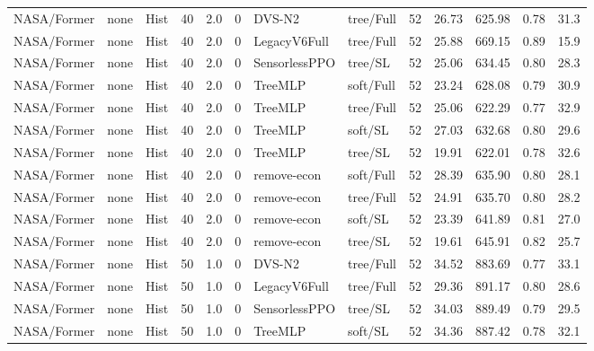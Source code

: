 \documentclass[10pt,a4paper]{article}
\begin{document}
\begin{landscape}
\begin{longtable}{llllllllrrrrr}
NASA/Former & none & Hist & 40 & 2.0 & 0 & DVS-N2 & tree/Full & 52 & 26.73 & 625.98 & 0.78 & 31.3 \\

NASA/Former & none & Hist & 40 & 2.0 & 0 & LegacyV6Full & tree/Full & 52 & 25.88 & 669.15 & 0.89 & 15.9 \\

NASA/Former & none & Hist & 40 & 2.0 & 0 & SensorlessPPO & tree/SL & 52 & 25.06 & 634.45 & 0.80 & 28.3 \\

NASA/Former & none & Hist & 40 & 2.0 & 0 & TreeMLP & soft/Full & 52 & 23.24 & 628.08 & 0.79 & 30.9 \\

NASA/Former & none & Hist & 40 & 2.0 & 0 & TreeMLP & tree/Full & 52 & 25.06 & 622.29 & 0.77 & 32.9 \\

NASA/Former & none & Hist & 40 & 2.0 & 0 & TreeMLP & soft/SL & 52 & 27.03 & 632.68 & 0.80 & 29.6 \\

NASA/Former & none & Hist & 40 & 2.0 & 0 & TreeMLP & tree/SL & 52 & 19.91 & 622.01 & 0.78 & 32.6 \\

NASA/Former & none & Hist & 40 & 2.0 & 0 & remove-econ & soft/Full & 52 & 28.39 & 635.90 & 0.80 & 28.1 \\

NASA/Former & none & Hist & 40 & 2.0 & 0 & remove-econ & tree/Full & 52 & 24.91 & 635.70 & 0.80 & 28.2 \\

NASA/Former & none & Hist & 40 & 2.0 & 0 & remove-econ & soft/SL & 52 & 23.39 & 641.89 & 0.81 & 27.0 \\

NASA/Former & none & Hist & 40 & 2.0 & 0 & remove-econ & tree/SL & 52 & 19.61 & 645.91 & 0.82 & 25.7 \\

NASA/Former & none & Hist & 50 & 1.0 & 0 & DVS-N2 & tree/Full & 52 & 34.52 & 883.69 & 0.77 & 33.1 \\

NASA/Former & none & Hist & 50 & 1.0 & 0 & LegacyV6Full & tree/Full & 52 & 29.36 & 891.17 & 0.80 & 28.6 \\

NASA/Former & none & Hist & 50 & 1.0 & 0 & SensorlessPPO & tree/SL & 52 & 34.03 & 889.49 & 0.79 & 29.5 \\

NASA/Former & none & Hist & 50 & 1.0 & 0 & TreeMLP & soft/SL & 52 & 34.36 & 887.42 & 0.78 & 32.1 \\


\end{longtable}
\end{landscape}
\end{document}
